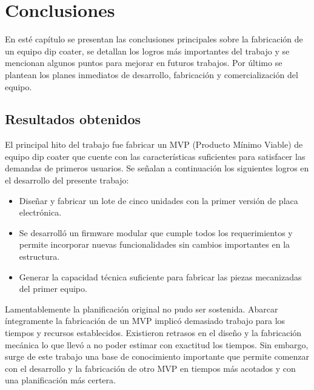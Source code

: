 
\chapter{Conclusiones} %

\label{Chapter5} %



En esté capítulo se presentan las conclusiones principales sobre la fabricación de un equipo dip coater, se detallan los logros más importantes del trabajo y se mencionan algunos puntos para mejorar en futuros trabajos. Por último se plantean los planes inmediatos de desarrollo, fabricación y comercialización del equipo.

\section{Resultados obtenidos }


El principal hito del trabajo fue fabricar un MVP (Producto Mínimo Viable) de equipo dip coater que cuente con las características suficientes para satisfacer las demandas de primeros usuarios. 
Se señalan a continuación los siguientes logros en el desarrollo del presente trabajo: 
\begin{itemize}
\item Diseñar y fabricar un lote de cinco unidades con la primer versión de placa electrónica.
\item Se desarrolló un firmware modular que cumple todos los requerimientos y permite incorporar nuevas funcionalidades sin cambios importantes en la estructura.
\item Generar la capacidad técnica suficiente para fabricar las piezas mecanizadas del primer equipo.  
\end{itemize} 
 

Lamentablemente la planificación original no pudo ser sostenida. Abarcar íntegramente la fabricación de un MVP implicó demasiado trabajo para los tiempos y recursos establecidos. Existieron retrasos en el diseño y la fabricación mecánica lo que llevó a no poder estimar con exactitud los tiempos. Sin embargo, surge de este trabajo una base de conocimiento importante que permite comenzar con el desarrollo y la fabricación de otro MVP en tiempos más acotados y con una planificación más certera. 


